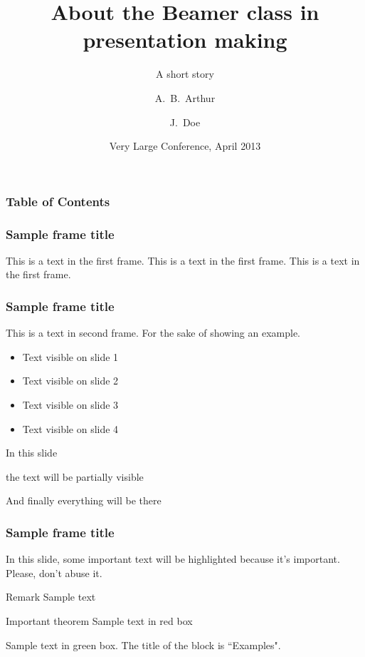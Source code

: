 \documentclass{beamer}
\title[About Beamer] %
{About the Beamer class in presentation making}
\subtitle{A short story}
\author[Arthur, Doe] %
{A.~B.~Arthur\inst{1} \and J.~Doe\inst{2}}
\institute[VFU] %
{
  \inst{1}%
  Faculty of Physics\\
  Very Famous University
  \and
  \inst{2}%
  Faculty of Chemistry\\
  Very Famous University
}
\date[VLC 2013] %
{Very Large Conference, April 2013}
\begin{document}
  \frame{\titlepage}

  \begin{frame}
    \frametitle{Table of Contents}
    \tableofcontents
  \end{frame}

  \begin{frame}
    \frametitle{Sample frame title}
    This is a text in the first frame. This is a text in the first frame. This is a text in the first frame.
  \end{frame}

  \begin{frame}
    \frametitle{Sample frame title}
    This is a text in second frame.
    For the sake of showing an example.

    \begin{itemize}
     \item<1-> Text visible on slide 1
     \item<2-> Text visible on slide 2
     \item<3> Text visible on slide 3
     \item<4-> Text visible on slide 4
    \end{itemize}

  \end{frame}

  \begin{frame}
    In this slide \pause

    the text will be partially visible \pause

    And finally everything will be there
  \end{frame}

  \begin{frame}
    \frametitle{Sample frame title}

    In this slide, some important text will be
    \alert{highlighted} because it's important.
    Please, don't abuse it.

    \begin{block}{Remark}
      Sample text
    \end{block}

    \begin{alertblock}{Important theorem}
      Sample text in red box
    \end{alertblock}

    \begin{examples}
      Sample text in green box. The title of the block is ``Examples".
    \end{examples}
  \end{frame}
\end{document}
